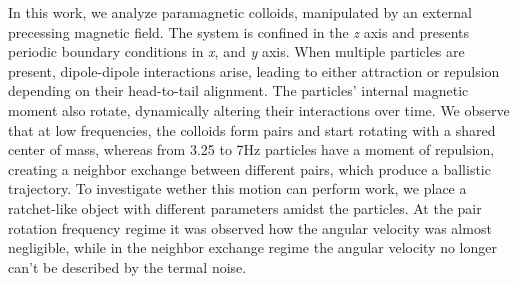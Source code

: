 In this work, we analyze paramagnetic colloids, manipulated by an external precessing magnetic field. The system is confined in the \textit{z} axis and presents periodic boundary conditions in \textit{x}, and \textit{y} axis. When multiple particles are present, dipole-dipole interactions arise, leading to either attraction or repulsion depending on their head-to-tail alignment. The particles' internal magnetic moment also rotate, dynamically altering their interactions over time. We observe that at low frequencies, the colloids form pairs and start rotating with a shared center of mass, whereas from 3.25 to 7Hz particles have a moment of repulsion, creating a neighbor exchange between different pairs, which produce a ballistic trajectory. To investigate wether this motion can perform work, we place a ratchet-like object with different parameters amidst the particles. At the pair rotation frequency regime it was observed how the angular velocity was almost negligible, while in the neighbor exchange regime the angular velocity no longer can't be described by the termal noise.

\newpage %

\listoffigures
{}

\listoftables
{}

\tableofcontents
\newpage

